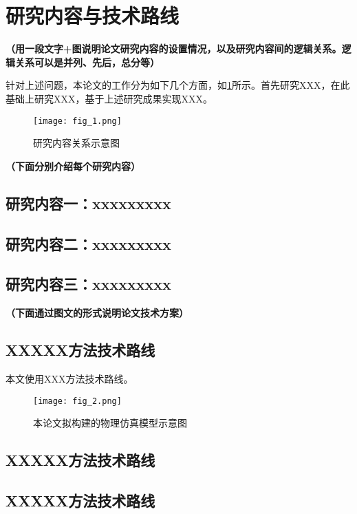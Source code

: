 \clearpage
\section{研究内容与技术路线}

\textbf{\color{red}（用一段文字+图说明论文研究内容的设置情况，以及研究内容间的逻辑关系。逻辑关系可以是并列、先后，总分等）}

针对上述问题，本论文的工作分为如下几个方面，如\cref{fig_1}所示。首先研究XXX，在此基础上研究XXX，基于上述研究成果实现XXX。

\begin{figure}[h] \label{fig_1}
	\centering
	\texttt{[image: fig\_1.png]}
	\caption{研究内容关系示意图}
\end{figure}

\textbf{\color{red}（下面分别介绍每个研究内容）}


\subsection{研究内容一：xxxxxxxxx}

\subsection{研究内容二：xxxxxxxxx}

\subsection{研究内容三：xxxxxxxxx}

\textbf{\color{red}（下面通过图文的形式说明论文技术方案）}

\subsection{XXXXX方法技术路线}

本文使用XXX方法技术路线。

\begin{figure}[h] \label{fig_2}
	\centering
	\texttt{[image: fig\_2.png]}
	\caption{本论文拟构建的物理仿真模型示意图}
\end{figure}

\subsection{XXXXX方法技术路线}

\subsection{XXXXX方法技术路线}
